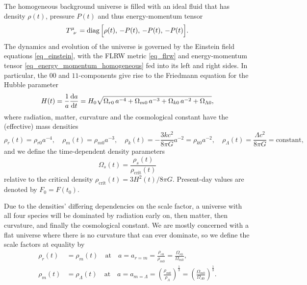 \documentclass[10pt,a4paper]{article}
\DeclareMathOperator{\diag}{diag}
\begin{document}
The homogeneous background universe is filled with an ideal fluid that has
density $\rho(t)$, pressure $P(t)$ and thus energy-momentum tensor
\begin{equation}
	T\indices{^\mu_\nu} = \diag\Big[\rho(t),\, -P(t),\, -P(t),\, -P(t)\Big].
\label{eq_energy_momentum_homogeneous}
\end{equation}
The dynamics and evolution of the universe is governed by the Einstein field equations \eqref{eq_einstein},
with the FLRW metric \eqref{eq_flrw} and energy-momentum tensor \eqref{eq_energy_momentum_homogeneous} fed into its left and right sides.
In particular, the $00$ and $11$-components give rise to the Friedmann equation for the Hubble parameter
\begin{equation}
	H(t) = \frac{1}{a} \odv{a}{t} = H_0 \sqrt{\Omega_{r0} \, a^{-4} + \Omega_{m0} \, a^{-3} + \Omega_{k0} \, a^{-2} + \Omega_{\Lambda0}},
\label{eq_friedmann}
\end{equation}
where radiation, matter, curvature and the cosmological constant have the (effective) mass densities
\begin{equation}
	\rho_r(t) = \rho_{r0} a^{-4}, \quad
	\rho_m(t) = \rho_{m0} a^{-3}, \quad
	\rho_k(t) = -\frac{3kc^2}{8 \pi G} a^{-2} = \rho_{k0} a^{-2}, \quad
	\rho_\Lambda(t) = \frac{\Lambda c^2}{8 \pi G} = \text{constant},
\end{equation}
and we define the time-dependent density parameters
\begin{equation}
	\Omega_s(t) = \frac{\rho_s(t)}{\rho_\text{crit}(t)}
\label{eq_density_parameters}
\end{equation}
relative to the critical density $\rho_\text{crit}(t) = 3H^2(t)/8\pi G$.
Present-day values are denoted by $F_0=F(t_0)$.

Due to the densities' differing dependencies on the scale factor,
a universe with all four species will be dominated by radiation early on, then matter, then curvature, and finally the cosmological constant.
We are mostly concerned with a flat universe where there is no curvature that can ever dominate,
so we define the scale factors at equality by
\begin{subequations}
\begin{align}
	\rho_r(t) &= \rho_m(t)       \quad \text{at} \quad a = a_{r=m} = \frac{\rho_{r0}}{\rho_{m0}} = \frac{\Omega_{r0}}{\Omega_{m0}}, \\
	\rho_m(t) &= \rho_\Lambda(t) \quad \text{at} \quad a = a_{m=\Lambda} = \left(\frac{\rho_{m0}}{\rho_{\Lambda}}\right)^\frac13 = \left(\frac{\Omega_{m0}}{\Omega_{\Lambda0}}\right)^\frac13.
\end{align}
\label{eq_equality_times}
\end{subequations}
\end{document}
